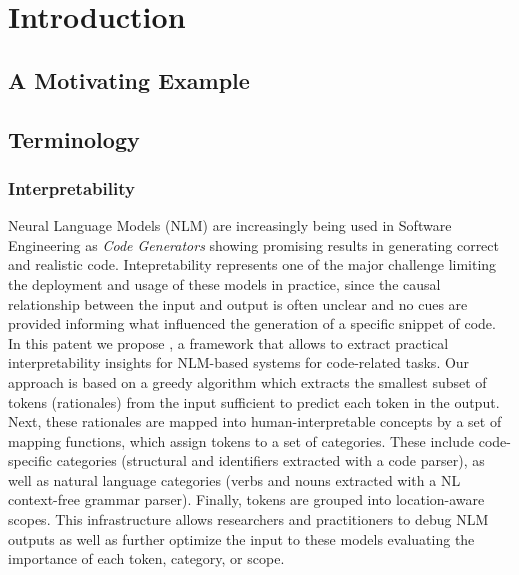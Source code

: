 \chapter{Introduction} %
\label{ch:intro}



\section{A Motivating Example}

\section{Terminology}

\subsection{Interpretability}
Neural Language Models (NLM) are increasingly being used in Software Engineering as \textit{Code Generators} showing promising results in generating correct and realistic code. Intepretability represents one of the major challenge limiting the deployment and usage of these models in practice, since the causal relationship between the input and output is often unclear and no cues are provided informing what influenced the generation of a specific snippet of code. In this patent we propose \codeSeqRational, a framework that allows to extract practical interpretability insights for NLM-based systems for code-related tasks. Our approach is based on a greedy algorithm which extracts the smallest subset of tokens (rationales) from the input sufficient to predict each token in the output. Next, these rationales are mapped into human-interpretable concepts by a set of mapping functions, which assign tokens to a set of categories. These include code-specific categories (\ie structural and identifiers extracted with a code parser), as well as natural language categories (\eg verbs and nouns extracted with a NL context-free grammar parser). Finally, tokens are grouped into location-aware scopes. This infrastructure allows researchers and practitioners to debug NLM outputs as well as further optimize the input to these models evaluating the importance of each token, category, or scope.